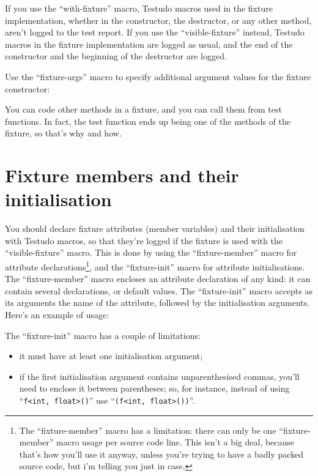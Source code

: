 \documentclass[twoside, a4paper, article]{memoir}
\newcommand\typesetexampleandreport[1]{%
  \typesetexamplesource{#1}
  \typesetexamplereport{#1}
}
\providecommand\typesetexamplereport[1]{%
}
\providecommand\typesetexamplesource[1]{%
}
\begin{document}
If you use the ``with-fixture'' macro, Testudo macros used in the fixture
implementation, whether in the constructor, the destructor, or any other
method, aren't logged to the test report.  If you use the ``visible-fixture''
instead, Testudo macros in the fixture implementation are logged as usual, and
the end of the constructor and the beginning of the destructor are logged.

Use the ``fixture-args'' macro to specify additional argument values for the
fixture constructor:

\typesetexampleandreport{fixture-outatime-test-arguments}

You can code other methods in a fixture, and you can call them from test
functions.  In fact, the test function ends up being one of the methods of the
fixture, so that's why and how.

\section{Fixture members and their initialisation}
\label{sec:fixture-members-and-initialisation}

You should declare fixture attributes (member variables) and their
initialisation with Testudo macros, so that they're logged if the fixture is
used with the ``visible-fixture'' macro.  This is done by using the
``fixture-member'' macro for attribute declarations\footnote{The
  ``fixture-member'' macro has a limitation: there can only be one
  ``fixture-member'' macro usage per source code line.  This isn't a big deal,
  because that's how you'll use it anyway, unless you're trying to have a badly
  packed source code, but i'm telling you just in case.}, and the
``fixture-init'' macro for attribute initialisations.  The ``fixture-member''
macro encloses an attribute declaration of any kind: it can contain several
declarations, or default values.  The ``fixture-init'' macro accepts as its
arguments the name of the attribute, followed by the initialisation arguments.
Here's an example of usage:

\typesetexampleandreport{fixture-members}

The ``fixture-init'' macro has a couple of limitations:
\begin{itemize}
\item it must have at least one initialisation argument;
\item if the first initialisation argument contains unparenthesised commas,
  you'll need to enclose it between parentheses; so, for instance, instead of
  using ``\texttt{f<int, float>()}'' use ``\texttt{(f<int, float>())}''.
\end{itemize}
\end{document}
